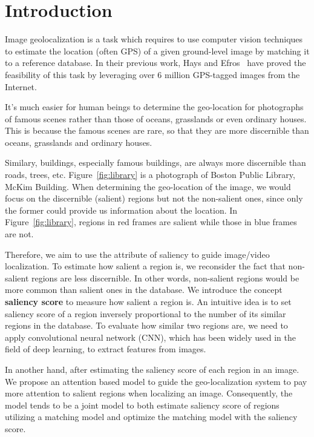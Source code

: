 \section{Introduction}
\par
Image geolocalization is a task which requires to use computer vision techniques to estimate the location (often GPS) of a given ground-level image by matching it to a reference database. In their previous work, Hays and Efros~\cite{hays2008im2gps} have proved the feasibility of this task by leveraging over 6 million GPS-tagged images from the Internet.
\par
It's much easier for human beings to determine the geo-location for photographs of famous scenes rather than those of oceans, grasslands or even ordinary houses. This is because the famous scenes are rare, so that they are more discernible than oceans, grasslands and ordinary houses.
\par 
Similary, buildings, especially famous buildings, are always more discernible than roads, trees, etc.  Figure~\ref{fig:library} is a photograph of Boston Public Library, McKim Building. When determining the geo-location of the image, we would focus on the discernible (salient) regions but not the non-salient ones, since only the former could provide us information about the location. In Figure~\ref{fig:library}, regions in red frames are salient while those in blue frames are not.
\par
Therefore, we aim to use the attribute of saliency to guide image/video localization. To estimate how salient a region is, we reconsider the fact that non-salient regions are less discernible. In other words, non-salient regions would be more common than salient ones in the database. We introduce the concept \textbf{saliency score} to measure how salient a region is. An intuitive idea is to set saliency score of a region inversely proportional to the number of its similar regions in the database. To evaluate how similar two regions are, we need to apply convolutional neural network (CNN), which has been widely used in the field of deep learning, to extract features from images. 
\par
In another hand, after estimating the saliency score of each region in an image. We propose an attention based model to guide the geo-localization system to pay more attention to salient regions when localizing an image. Consequently, the model tends to be a joint model to both estimate saliency score of regions utilizing a matching model and optimize the matching model with the saliency score. 
